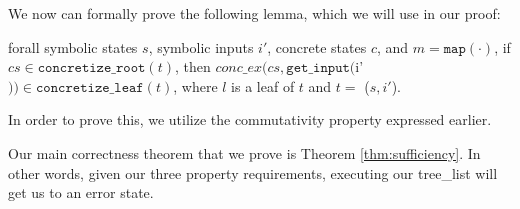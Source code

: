 We now can formally prove the following lemma, which we will use in our proof:
\begin{lemma} \label{cop}
forall symbolic states $s$, symbolic inputs $i'$, concrete states $c$, and $m = \mathtt{map(\cdot)}$,
if $cs \in \mathtt{concretize\_root}(t)$,
then 
$conc\_ex(cs, \mathtt{get\_input} ($i'$)) \in \mathtt{concretize\_leaf}(t)$,
where $l$ is a leaf of $t$ and $t = $ \symexecution($s, i'$).
\end{lemma}

In order to prove this, we utilize the commutativity property expressed earlier.





Our main correctness theorem that we prove is Theorem \ref{thm:sufficiency}. In other words, given our three property requirements, executing our tree\_list will get us to an error state.

